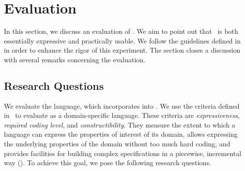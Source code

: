 \section{Evaluation}
\label{sect:evaluation} 


In this section, we discuss an evaluation of \agl. We aim to point out that \agl~is both essentially expressive and practically usable. We follow the guidelines defined in~\cite{runesonGuidelinesConductingReporting2009} in order to  enhance the rigor of this experiment. The section closes a discussion with several remarks concerning the evaluation.

\subsection{Research Questions}
\label{subsect:researchQuestions} 

%

We evaluate the \agldcsl language, which incorporates \agl into \dcsl. We use the criteria defined in~\cite{thakur2019role} to evaluate \agldcsl as a domain-specific language. These criteria are \textit{expressiveness}, \textit{required coding level}, and \textit{constructibility}. They measure the extent to which a language can express the properties of interest of its domain, allows expressing the underlying properties of the domain without too much hard coding, and provides facilities for building complex specifications in a piecewise, incremental way (\resp). To achieve this goal, we pose the following research questions.

